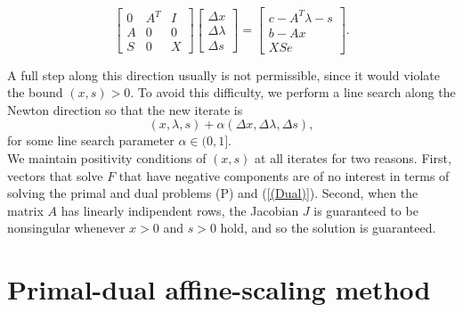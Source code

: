 \documentclass[a4paper,10 pt,titlepage,twoside]{book}
\theoremstyle{plain}
\theoremstyle{definition}
\theoremstyle{remark}
\begin{document}
\begin{equation}\label{(5.1)}
	\begin{bmatrix}
0&A^{T}&I \\A&0&0\\S&0&X
	\end{bmatrix}\begin{bmatrix}
	\Delta x\\\Delta\lambda \\\Delta s
	\end{bmatrix}=\begin{bmatrix}
	c-A^{T}\lambda-s\\b-Ax\\XSe
	\end{bmatrix}.
\end{equation}

A full step along this direction usually is not permissible, since it would violate the bound $(x,s)>0$. To avoid this difficulty, we perform a line search along the Newton direction so that the new iterate is
\begin{equation*}
	(x,\lambda,s) +\alpha (\Delta x,\Delta \lambda,\Delta s),
\end{equation*} 
for some line search parameter $\alpha \in (0,1]$. \\We maintain positivity conditions of $(x,s)$ at all iterates for two reasons. First, vectors that solve $\mathit{F}$ that have negative components are of no interest in terms of solving the primal and dual problems (P) and (\ref{(Dual)}). Second, when the matrix $A$ has linearly indipendent rows, the Jacobian $J$ is guaranteed to be nonsingular whenever $x>0$ and $s>0$ hold, and so the solution is guaranteed.

\section{Primal-dual affine-scaling method}
\end{document}
